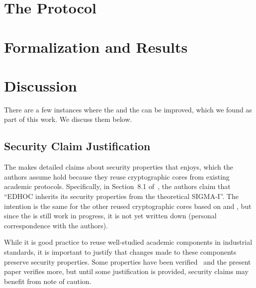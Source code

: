 \documentclass[runningheads, envcountsame, a4paper, draft, x11names]{llncs}
\begin{document}
 
\section{The \mEdhoc{} Protocol}
\label{sec:edhoc}


 
\section{Formalization and Results}
\label{sec:formalization}


 
\section{Discussion}
\label{sec:discussion}
 
There are a few instances where the \mEdhoc{} and the \mSpec{} can be improved,
which we found as part of this work. We discuss them below.
%
 

\subsection{Security Claim Justification}
\label{sec:securityClaims}
 
The \mSpec{} makes detailed claims about security properties that \mEdhoc{}
enjoys, which the authors assume hold because they reuse cryptographic cores
from existing academic protocols.
%
Specifically, in Section~8.1 of~\cite{selander-lake-edhoc-01}, the authors
claim that ``EDHOC inherits its security properties from the theoretical
SIGMA-I''.
%
The intention is the same for the other reused cryptographic
cores based on \mOptls{} and \mNoise{}, but since the \mSpec{} is still work in
progress, it is not yet written down (personal correspondence with the authors).
%

While it is good practice to reuse well-studied academic components in
industrial standards, it is important to justify that changes made to these
components preserve security properties.
%
Some properties have been verified~\cite{DBLP:conf/secsr/BruniJPS18} and the
present paper verifies more, but until some justification is provided, security
claims may benefit from note of caution.
 
\end{document}
